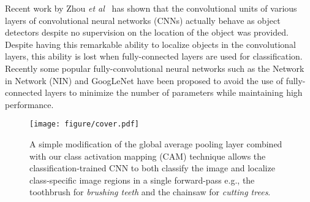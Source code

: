 \documentclass[10pt,twocolumn,letterpaper]{article}
\begin{document}

Recent work by Zhou \textit{et al}~\cite{zhou2014object} has shown that the convolutional units of various layers of convolutional neural networks (CNNs) actually behave as object detectors despite no supervision on the location of the object was provided. Despite having this remarkable ability to localize objects in the convolutional layers, this ability is lost when fully-connected layers are used for classification. Recently some popular fully-convolutional neural networks such as the Network in Network (NIN) \cite{lin2013network} and GoogLeNet \cite{szegedy2014going} have been proposed to avoid the use of fully-connected layers to minimize the number of parameters while maintaining high performance. 

\begin{figure}
\begin{center}
\texttt{[image: figure/cover.pdf]}
\end{center}
\vspace*{-4mm}
\caption{A simple modification of the global average pooling layer combined with our class activation mapping (CAM) technique allows the classification-trained CNN to both classify the image and localize class-specific image regions in a single forward-pass e.g., the toothbrush for \textit{brushing teeth} and the chainsaw for \textit{cutting trees}.}\label{figure_cover}
\end{figure}
\end{document}

